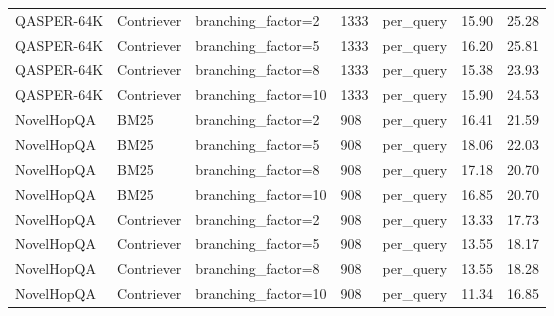 \begin{tabular}{lllllll}
QASPER-64K & Contriever & branching\_factor=2 & 1333 & per\_query & 15.90 & 25.28 \\
QASPER-64K & Contriever & branching\_factor=5 & 1333 & per\_query & 16.20 & 25.81 \\
QASPER-64K & Contriever & branching\_factor=8 & 1333 & per\_query & 15.38 & 23.93 \\
QASPER-64K & Contriever & branching\_factor=10 & 1333 & per\_query & 15.90 & 24.53 \\
NovelHopQA & BM25 & branching\_factor=2 & 908 & per\_query & 16.41 & 21.59 \\
NovelHopQA & BM25 & branching\_factor=5 & 908 & per\_query & 18.06 & 22.03 \\
NovelHopQA & BM25 & branching\_factor=8 & 908 & per\_query & 17.18 & 20.70 \\
NovelHopQA & BM25 & branching\_factor=10 & 908 & per\_query & 16.85 & 20.70 \\
NovelHopQA & Contriever & branching\_factor=2 & 908 & per\_query & 13.33 & 17.73 \\
NovelHopQA & Contriever & branching\_factor=5 & 908 & per\_query & 13.55 & 18.17 \\
NovelHopQA & Contriever & branching\_factor=8 & 908 & per\_query & 13.55 & 18.28 \\
NovelHopQA & Contriever & branching\_factor=10 & 908 & per\_query & 11.34 & 16.85 \\
\hline
\end{tabular}
